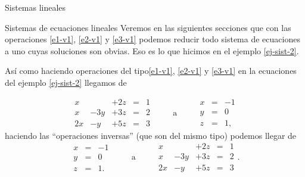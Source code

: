 \begin{chapter}{Sistemas lineales}
\begin{section}{Sistemas de ecuaciones lineales}
Veremos en las siguientes secciones que con las operaciones \ref{e1-v1}, \ref{e2-v1} y \ref{e3-v1} podemos reducir todo sistema de ecuaciones a uno cuyas soluciones son obvias. Eso es lo que hicimos en el ejemplo \ref{ej-sist-2}.  
    
    
\begin{ejemplo*}
Así como  haciendo operaciones del tipo\ref{e1-v1}, \ref{e2-v1} y \ref{e3-v1}   en la ecuaciones del ejemplo \ref{ej-sist-2}   llegamos de 
    
    \begin{equation*}
    \begin{matrix}
    x &  & +2z & =& 1 \\
    x& -3y & +3z & =&2 \\
    2x& -y & +5z & =&3
    \end{matrix}
    \qquad \text{ a } 
    \qquad 
    \begin{matrix}x&=&-1\\ y&=&0 \\ z&=&1,
    \end{matrix}
    \end{equation*}
haciendo  las ``operaciones inversas'' (que son del mismo tipo)  podemos llegar de  
\begin{equation*}
\begin{matrix}x&=&-1\\ y&=&0 \\ z&=&1.
\end{matrix}
\qquad \text{ a } 
\qquad 
\begin{matrix}
x &  & +2z & =& 1 \\
x& -3y & +3z & =&2 \\
2x& -y & +5z & =&3
\end{matrix}.
\end{equation*}
\end{ejemplo*}


\end{section}
\end{chapter}
